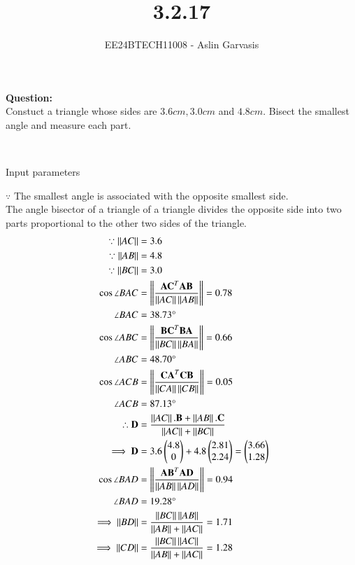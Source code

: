 \documentclass[journal]{IEEEtran}
\begin{document}

\vspace{3cm}
\title{3.2.17}
\author{EE24BTECH11008 - Aslin Garvasis
}
{\let\newpage\relax\maketitle}

\renewcommand{\thefigure}{\theenumi}
\renewcommand{\thetable}{\theenumi}
\setlength{\intextsep}{10pt} %


 \textbf{Question:}\\Constuct a triangle whose sides are $3.6cm, 3.0cm$ and $4.8cm.$ Bisect the smallest angle and measure each part.
 
 \solution \\ 
 \begin{table}[h!]    
  \centering
  
  \caption{Input parameters}
  \label{tab1.1.9.16}
\end{table}
$\because$ The smallest angle is associated with the opposite smallest side.\\
The angle bisector of a triangle of a triangle divides the opposite side into two parts proportional to the other two sides of the triangle.\\
\begin{align}
	\because \left\lVert AC\right\rVert&=3.6\\
	\because \left\lVert AB\right\rVert&=4.8\\
	\because \left\lVert BC\right\rVert&=3.0\\
	\cos{\angle BAC}&=\left\lVert\frac{\mathbf{AC}^T\mathbf{AB}}{\left\lVert AC\right\rVert\left\lVert AB\right\rVert}\right\rVert=0.78\\
	\angle{BAC}&=38.73\degree\\
	\cos{\angle ABC}&=\left\lVert\frac{\mathbf{BC}^T\mathbf{BA}}{\left\lVert BC\right\rVert\left\lVert BA\right\rVert}\right\rVert=0.66\\
	\angle{ABC}&=48.70\degree\\
	\cos{\angle ACB}&=\left\lVert\frac{\mathbf{CA}^T\mathbf{CB}}{\left\lVert CA\right\rVert\left\lVert CB\right\rVert}\right\rVert=0.05\\
	\angle{ACB}&=87.13\degree\\
	\therefore \mathbf{D}&=\frac{\left\lVert AC\right\rVert.\mathbf{B}+\left\lVert AB\right\rVert.\mathbf{C}}{\left\lVert AC\right\rVert+\left\lVert BC\right\rVert}\\
	\implies \mathbf{D}&=3.6\begin{pmatrix}4.8\\0\end{pmatrix}+4.8\begin{pmatrix}2.81\\2.24\end{pmatrix}=\begin{pmatrix}3.66\\1.28\end{pmatrix}\\
	\cos{\angle BAD}&=\left\lVert\frac{\mathbf{AB}^T\mathbf{AD}}{\left\lVert AB\right\rVert\left\lVert AD\right\rVert}\right\rVert=0.94\\
	\angle{BAD}&=19.28\degree\\
	\implies \left\lVert BD\right\rVert&=\frac{\left\lVert BC\right\rVert\left\lVert AB\right\rVert}{\left\lVert AB\right\rVert+\left\lVert AC\right\rVert}=1.71\\
	\implies \left\lVert CD\right\rVert&=\frac{\left\lVert BC\right\rVert\left\lVert AC\right\rVert}{\left\lVert AB\right\rVert+\left\lVert AC\right\rVert}=1.28
 \end{align}
 \newpage
\end{document}
